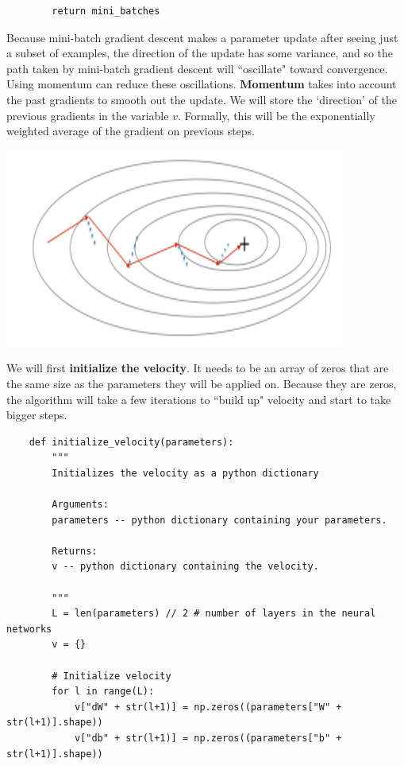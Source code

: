 \documentclass[11pt, a4paper]{article}
\begin{document}
\begin{spacing}{1.1}
\begin{lstlisting}
		return mini_batches \end{lstlisting} \vspace*{1mm}
	Because mini-batch gradient descent makes a parameter update after seeing just a subset of examples, the direction of the update has some variance, and so the path taken by mini-batch gradient descent will ``oscillate" toward convergence. Using momentum can reduce these oscillations. \textbf{Momentum} takes into account the past gradients to smooth out the update. We will store the `direction' of the previous gradients in the variable $v$. Formally, this will be the exponentially weighted average of the gradient on previous steps.
	\begin{center}	\includegraphics[scale=.6]{velocity} \\	\end{center}
	We will first \textbf{initialize the velocity}. It needs to be an array of zeros that are the same size as the parameters they will be applied on. Because they are zeros, the algorithm will take a few iterations to ``build up" velocity and start to take bigger steps. \newpage

	\begin{lstlisting}
	def initialize_velocity(parameters):
		"""
		Initializes the velocity as a python dictionary
		
		Arguments:
		parameters -- python dictionary containing your parameters.
		
		Returns:
		v -- python dictionary containing the velocity.

		"""
		L = len(parameters) // 2 # number of layers in the neural networks
		v = {}
		
		# Initialize velocity
		for l in range(L):
			v["dW" + str(l+1)] = np.zeros((parameters["W" + str(l+1)].shape))
			v["db" + str(l+1)] = np.zeros((parameters["b" + str(l+1)].shape))
		

\end{lstlisting}
\end{spacing}
\end{document}

